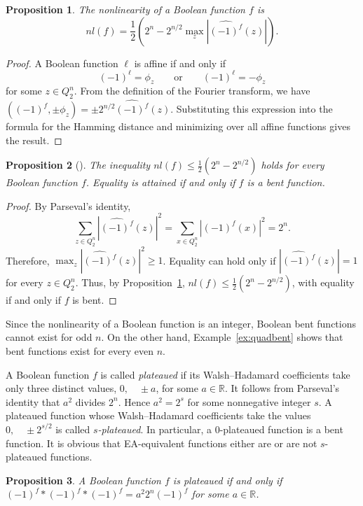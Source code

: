 \documentclass[11pt]{article}
\newtheorem{claim}{Proposition}[section]
\theoremstyle{definition}
\begin{document}
{{{\begin{claim}\label{cl:nl}
The nonlinearity of a Boolean function $f$ is
\[
nl(f)
=\frac12\left(
2^n-2^{n/2}\max_z
\left|\widehat{(-1)^f}(z)\right|
\right).
\]
\end{claim}

\begin{proof}
A Boolean function $\ell$ is affine if and only if
\[
(-1)^\ell=\phi_z
\qquad\text{or}\qquad
(-1)^\ell=-\phi_z
\]
for some $z\in Q_2^n$. From the definition of the Fourier transform, we have
$((-1)^f,\pm\phi_z)
=\pm2^{n/2}\widehat{(-1)^f}(z)$.
Substituting this expression into the formula for the Hamming distance and minimizing over all affine functions gives the result.
\end{proof}

\begin{claim}[\cite{Rot}]
The inequality
$nl(f)\leq \frac12\left(2^n-2^{n/2}\right)$
holds for every Boolean function $f$. Equality is attained if and only if $f$ is a bent function.
\end{claim}

\begin{proof}
By Parseval's identity,
\[
\sum_{z\in Q_2^n}
\left|\widehat{(-1)^f}(z)\right|^2
=\sum\limits_{x\in Q_2^n}|(-1)^f(x)|^2
=2^n.
\]
Therefore,
$\max_z\left|\widehat{(-1)^f}(z)\right|^2\geq1$.
Equality can hold only if
$\left|\widehat{(-1)^f}(z)\right|=1$
for every $z\in Q_2^n$. Thus, by Proposition~\ref{cl:nl},
$nl(f)\leq\frac12\left(2^n-2^{n/2}\right)$,
with equality if and only if $f$ is bent.
\end{proof}

Since the nonlinearity of a Boolean function is an integer, Boolean bent functions cannot exist for odd $n$. On the other hand, Example~\ref{ex:quadbent} shows that bent functions exist for every even $n$.

A Boolean function $f$ is called {\sl plateaued} if its Walsh--Hadamard coefficients take only three distinct values,
$0,\quad \pm a$,
for some $a\in\mathbb R$.
It follows from Parseval's identity that $a^2$ divides $2^n$. Hence
$a^2=2^s$
for some nonnegative integer $s$. A plateaued function whose Walsh--Hadamard coefficients take the values
$0,\quad \pm2^{s/2}$
is called {\sl $s$-plateaued}. In particular, a $0$-plateaued function is a bent function.
It is obvious that EA-equivalent functions  either are or are not $s$-plateaued functions. 

\begin{claim}\label{plato}
A Boolean function $f$ is plateaued if and only if
$(-1)^f*(-1)^f*(-1)^f=
a^2 2^n(-1)^f$
for some $a\in\mathbb R$.
\end{claim}

}}}
\end{document}
